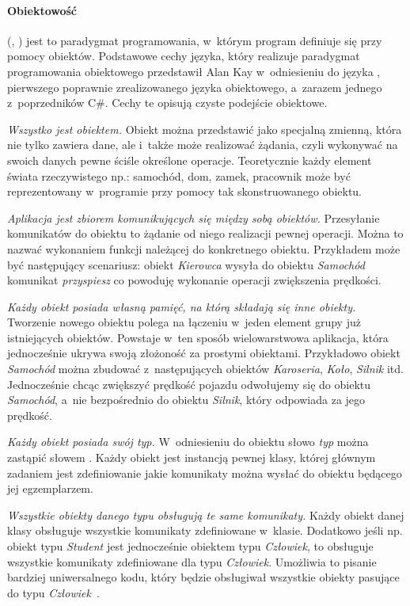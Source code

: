 \paragraph{Obiektowość}
 (, ) jest to paradygmat programowania, w~którym program definiuje się przy pomocy obiektów.
Podstawowe cechy języka, który realizuje paradygmat programowania obiektowego przedstawił Alan Kay w~odniesieniu do języka , pierwszego poprawnie zrealizowanego języka obiektowego, a~zarazem jednego z~poprzedników C\#. Cechy te opisują czyste podejście obiektowe.
\begin{description}
	\item \emph{Wszystko jest obiektem.} Obiekt można przedstawić jako specjalną zmienną, która nie tylko zawiera dane, ale i~także może realizować żądania, czyli wykonywać na swoich danych pewne ściśle określone operacje. Teoretycznie każdy element świata rzeczywistego np.: samochód, dom, zamek, pracownik może być reprezentowany w~programie przy pomocy tak skonstruowanego obiektu.
	\item \emph{Aplikacja jest zbiorem komunikujących się między sobą obiektów.} Przesyłanie komunikatów do obiektu to żądanie od niego realizacji pewnej operacji. Można to nazwać wykonaniem funkcji należącej do konkretnego obiektu. Przykładem może być następujący scenariusz: obiekt \emph{Kierowca} wysyła do obiektu \emph{Samochód} komunikat \emph{przyspiesz} co powoduję wykonanie operacji zwiększenia prędkości.
	\item \emph{Każdy obiekt posiada własną pamięć, na którą składają się inne obiekty.} Tworzenie nowego obiektu polega na łączeniu w~jeden element grupy już istniejących obiektów. Powstaje w~ten sposób wielowarstwowa aplikacja, która jednocześnie ukrywa swoją złożoność za prostymi obiektami. Przykładowo obiekt \emph{Samochód} można zbudować z~następujących obiektów \emph{Karoseria}, \emph{Koło}, \emph{Silnik} itd. Jednocześnie chcąc zwiększyć prędkość pojazdu odwołujemy się do obiektu \emph{Samochód}, a~nie bezpośrednio do obiektu \emph{Silnik}, który odpowiada za jego prędkość.
	\item \emph{Każdy obiekt posiada swój typ.} W~odniesieniu do obiektu słowo \emph{typ} można zastąpić słowem . Każdy obiekt jest instancją pewnej klasy, której głównym zadaniem jest zdefiniowanie jakie komunikaty można wysłać do obiektu będącego jej egzemplarzem.
	\item \emph{Wszystkie obiekty danego typu obsługują te same komunikaty.} Każdy obiekt danej klasy obsługuje wszystkie komunikaty zdefiniowane w~klasie. Dodatkowo jeśli np. obiekt typu \emph{Student} jest jednocześnie obiektem typu \emph{Człowiek}, to obsługuje wszystkie komunikaty zdefiniowane dla typu \emph{Człowiek}. Umożliwia to pisanie bardziej uniwersalnego kodu, który będzie obsługiwał wszystkie obiekty pasujące do typu \emph{Człowiek}~\cite{cSharp:progr}.
\end{description}

